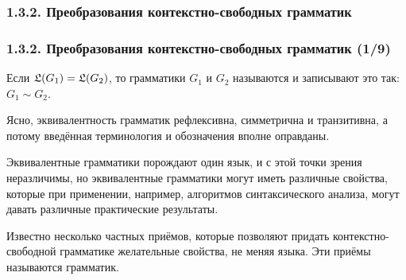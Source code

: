 \subsubsection{1.3.2. Преобразования контекстно-свободных грамматик}\label{1.3.2.}
\begin{frame}
\frametitle{1.3.2. Преобразования контекстно-свободных грамматик (1/9)}


Если $\frak{L}(G_1)=\frak{L}(G_2)$, 
то грамматики 
$G_1$ и $G_2$
называются  и записывают это так:
$G_1\sim G_2$.

\begin{remark}
Ясно, эквивалентность грамматик 
рефлексивна, симметрична и транзитивна,
а потому введённая терминология и обозначения
вполне оправданы.
\end{remark}

\medskip
{}

\medskip
Эквивалентные грамматики
порождают один язык, и с этой точки зрения
неразличимы, 
но эквивалентные грамматики
могут иметь различные свойства,
которые при применении, 
например, алгоритмов синтаксического 
анализа, могут давать различные практические результаты.   

\medskip
{}

Известно несколько частных приёмов,
которые позволяют придать
контекстно-свободной грамматике
желательные свойства, не меняя языка.
Эти приёмы называются
грамматик.
\end{frame}


